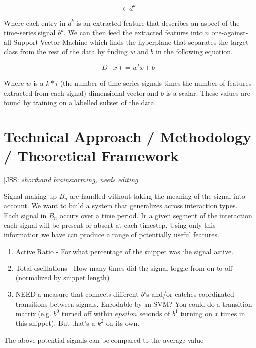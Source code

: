 \documentclass{article}
\newcommand{\meta}[1]{{\textcolor[rgb]{0.1,0.7,0.2}{[JSS: {\it #1}]}}}
\begin{document}
\begin{equation}
    [d^k_0 ... d^k_i] \in d^k
\end{equation}

Where each entry in $d^k$ is an extracted feature that describes an aspect of the time-series signal $b^k$. We can then feed the extracted features into $n$ one-against-all Support Vector Machine
which finds the hyperplane that separates the target class from the rest of the data by finding $w$ and $b$ in the following equation. \cite{abe_analysis_2003}

\begin{equation}
    D(x) = w^tx + b
\end{equation}

Where $w$ is a $k*i$ (the number of time-series signals times the number of features extracted from each signal) dimensional vector and $b$ is a scalar. These values are found by training on a labelled subset of the data. 

\section{Technical Approach / Methodology / Theoretical Framework}\label{formalization}

\meta{shorthand brainstorming, needs editing}

Signal making up $B_n$ are handled without taking the meaning of the signal into account. We want to build a system that generalizes across interaction types. Each signal in $B_n$ occurs over a time period. In a given segment of the interaction each signal will be present or absent at each timestep. Using only this information we have can produce a range of potentially useful features.

\begin{enumerate}
    \item Active Ratio - For what percentage of the snippet was the signal active.
    \item Total oscillations - How many times did the signal toggle from on to off (normalized by snippet length). 
    \item NEED a measure that connects different $b^k$s and/or catches coordinated transitions between signals. Encodable by an SVM? You could do a transition matrix (e.g. $b^0$ turned off within $epsilon$ seconds of $b^1$ turning on $x$ times in this snippet). But that's a $k^2$ on its own.
\end{enumerate}

The above potential signals can be compared to the average value 
\end{document}
